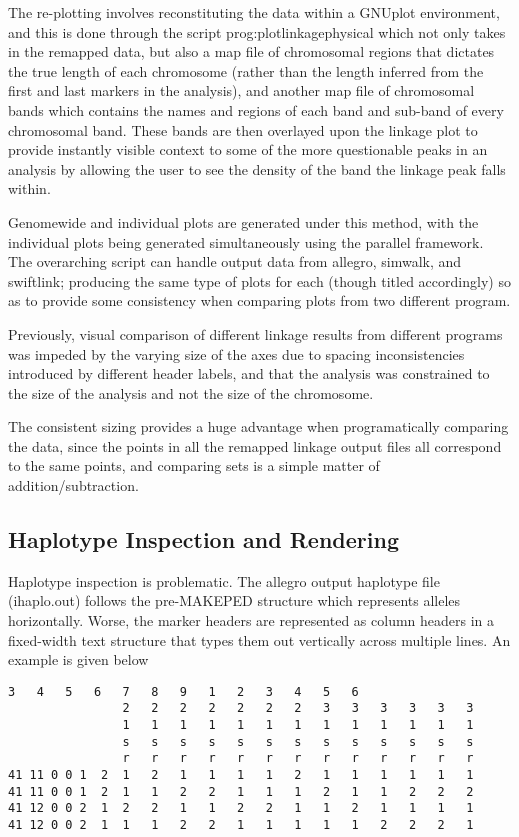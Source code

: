 The re-plotting involves reconstituting the data within a GNUplot  environment, and this is done through the script \gls{prog:plotlinkagephysical} which not only takes in the remapped data, but also a map file of chromosomal regions that dictates the true length of each chromosome (rather than the length inferred from the first and last markers in the analysis), and another map file of chromosomal bands which contains the names and regions of each band and sub-band of every chromosomal band. These bands are then overlayed upon the linkage plot to provide instantly visible context to some of the more questionable peaks in an analysis by allowing the user to see the density of the band the linkage peak falls within.

Genomewide and individual plots are generated under this method, with the individual plots being generated simultaneously using the parallel framework. The overarching script can handle output data from allegro, simwalk, and swiftlink; producing the same type of plots for each (though titled accordingly) so as to provide some consistency when comparing plots from two different program.

Previously, visual comparison of different linkage results from different programs was impeded by the varying size of the axes due to spacing inconsistencies introduced by different header labels, and that the analysis was constrained to the size of the analysis and not the size of the chromosome.

The consistent sizing provides a huge advantage when programatically comparing the data, since the points in all the remapped linkage output files all correspond to the same points, and comparing sets is a simple matter of addition/subtraction.


\subsection{Haplotype Inspection and Rendering}

Haplotype inspection is problematic. The allegro output haplotype file (ihaplo.out) follows the pre-MAKEPED structure which represents alleles horizontally. Worse, the marker headers are represented as column headers in a fixed-width text structure that types them out vertically across multiple lines. An example is given below

\begingroup
\begin{spacing}{1}
\begin{lstlisting}[label=verb:inhaplo]
				3	4	5	6	7	8	9 	1	2	3	4	5	6
				2	2	2	2	2	2	2	3	3	3	3	3	3
				1	1	1	1	1	1	1	1	1	1	1	1	1
				s	s	s	s	s	s	s	s	s	s	s	s	s
				r	r	r	r	r	r	r	r	r	r	r	r	r
41 11 0 0 1  2	1	2	1	1	1	1	2	1	1	1	1	1	1
41 11 0 0 1  2	1	1	2	2	1	1	1	2	1	1	2	2	2
41 12 0 0 2  1	2	2	1	1	2	2	1	1	2	1	1	1	1
41 12 0 0 2  1	1	1	2	2	1	1	1	1	1	2	2	2	1
\end{lstlisting}
\vspace{-9pt}
\end{spacing}
\endgroup

